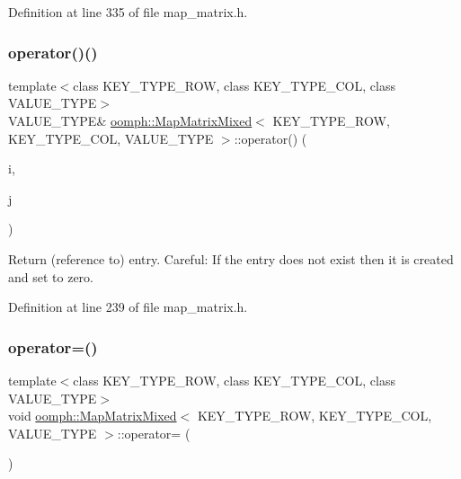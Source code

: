 Definition at line 335 of file map\+\_\+matrix.\+h.

\mbox{\label{classoomph_1_1MapMatrixMixed_ad348711a05b2266ccd0fa80b82992610}} 
\subsubsection{\texorpdfstring{operator()()}{operator()()}}
{\footnotesize\ttfamily template$<$class K\+E\+Y\+\_\+\+T\+Y\+P\+E\+\_\+\+R\+OW, class K\+E\+Y\+\_\+\+T\+Y\+P\+E\+\_\+\+C\+OL, class V\+A\+L\+U\+E\+\_\+\+T\+Y\+PE$>$ \\
V\+A\+L\+U\+E\+\_\+\+T\+Y\+PE\& \hyperlink{classoomph_1_1MapMatrixMixed}{oomph\+::\+Map\+Matrix\+Mixed}$<$ K\+E\+Y\+\_\+\+T\+Y\+P\+E\+\_\+\+R\+OW, K\+E\+Y\+\_\+\+T\+Y\+P\+E\+\_\+\+C\+OL, V\+A\+L\+U\+E\+\_\+\+T\+Y\+PE $>$\+::operator() (\begin{DoxyParamCaption}\item[{const K\+E\+Y\+\_\+\+T\+Y\+P\+E\+\_\+\+R\+OW \&}]{i,  }\item[{const K\+E\+Y\+\_\+\+T\+Y\+P\+E\+\_\+\+C\+OL \&}]{j }\end{DoxyParamCaption})\hspace{0.3cm}{\ttfamily [inline]}}



Return (reference to) entry. Careful\+: If the entry does not exist then it is created and set to zero. 



Definition at line 239 of file map\+\_\+matrix.\+h.

\mbox{\label{classoomph_1_1MapMatrixMixed_a5a52484fc1b32bcbda6a198de2bd83cb}} 
\subsubsection{\texorpdfstring{operator=()}{operator=()}}
{\footnotesize\ttfamily template$<$class K\+E\+Y\+\_\+\+T\+Y\+P\+E\+\_\+\+R\+OW, class K\+E\+Y\+\_\+\+T\+Y\+P\+E\+\_\+\+C\+OL, class V\+A\+L\+U\+E\+\_\+\+T\+Y\+PE$>$ \\
void \hyperlink{classoomph_1_1MapMatrixMixed}{oomph\+::\+Map\+Matrix\+Mixed}$<$ K\+E\+Y\+\_\+\+T\+Y\+P\+E\+\_\+\+R\+OW, K\+E\+Y\+\_\+\+T\+Y\+P\+E\+\_\+\+C\+OL, V\+A\+L\+U\+E\+\_\+\+T\+Y\+PE $>$\+::operator= (\begin{DoxyParamCaption}\item[{const \hyperlink{classoomph_1_1MapMatrixMixed}{Map\+Matrix\+Mixed}$<$ K\+E\+Y\+\_\+\+T\+Y\+P\+E\+\_\+\+R\+OW, K\+E\+Y\+\_\+\+T\+Y\+P\+E\+\_\+\+C\+OL, V\+A\+L\+U\+E\+\_\+\+T\+Y\+PE $>$ \&}]{ }\end{DoxyParamCaption})\hspace{0.3cm}{\ttfamily [inline]}}



